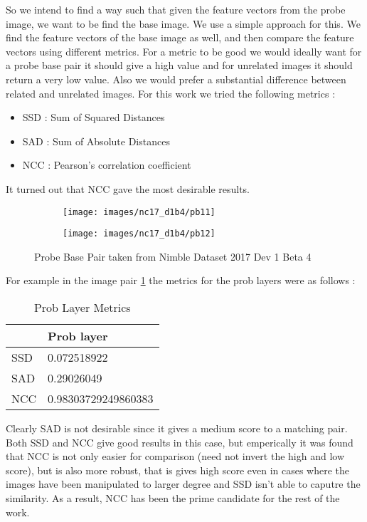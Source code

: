 \documentclass{article}
\begin{document}
So we intend to find a way such that given the feature vectors from the probe image, we want to be find the base image. We use a simple approach for this. We find the feature vectors of the base image as well, and then compare the feature vectors using different metrics. For a metric to be good we would ideally want for a probe base pair it should give a high value and for unrelated images it should return a very low value. Also we would prefer a substantial difference between related and unrelated images. For this work we tried the following metrics :
\begin{itemize}
\item SSD : Sum of Squared Distances
\item SAD : Sum of Absolute Distances
\item NCC : Pearson's correlation coefficient
\end{itemize}

It turned out that NCC gave the most desirable results.
\begin{figure}[H]
  \centering
  \begin{subfigure}[t]{0.45\textwidth}
    \centering
    \texttt{[image: images/nc17\_d1b4/pb11]}
  \end{subfigure}
  \begin{subfigure}[t]{0.45\textwidth}
    \centering
    \texttt{[image: images/nc17\_d1b4/pb12]}
  \end{subfigure}
  \caption{Probe Base Pair taken from Nimble Dataset 2017 Dev 1 Beta 4}
  \label{fig:ncc_res}
\end{figure}

For example in the image pair \ref{fig:ncc_res} the metrics for the prob layers were as follows :

\begin{table}[H]
\centering
\caption{Prob Layer Metrics}
\label{pb_metrics}
\begin{tabular}{|l|l|}
  \hline
  & Prob layer          \\
  \hline
  SSD & 0.072518922         \\
  SAD & 0.29026049          \\
  NCC & 0.98303729249860383 \\
  \hline
\end{tabular}
\end{table}

Clearly SAD is not desirable since it gives a medium score to a matching pair. Both SSD and NCC give good results in this case, but emperically it was found that NCC is not only easier for comparison (need not invert the high and low score), but is also more robust, that is gives high score even in cases where the images have been manipulated to larger degree and SSD isn't able to caputre the similarity. As a result, NCC has been the prime candidate for the rest of the work.
\end{document}
